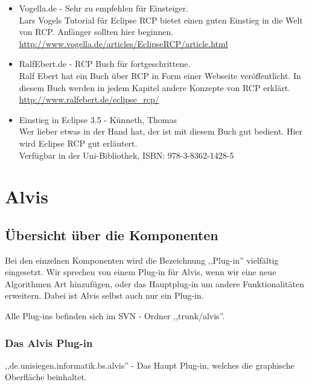 \documentclass[10pt,a4paper,oneside]{scrbook}
\begin{document}
\begin{itemize}
\item Vogella.de - Sehr zu empfehlen für Einsteiger. \\
Lars Vogels Tutorial für Eclipse RCP bietet einen guten Einstieg in die Welt von RCP. Anfänger sollten hier beginnen.\\
\url{http://www.vogella.de/articles/EclipseRCP/article.html}
\item RalfEbert.de - RCP Buch für fortgeschrittene. \\
Ralf Ebert hat ein Buch über RCP in Form einer Webseite veröffentlicht. In diesem Buch werden in jedem Kapitel andere Konzepte von RCP erklärt. \\
\url{http://www.ralfebert.de/eclipse\_rcp/}
\item Einstieg in Eclipse 3.5 - Künneth, Thomas \\
Wer lieber etwas in der Hand hat, der ist mit diesem Buch gut bedient. Hier wird Eclipse RCP gut erläutert. \\
Verfügbar in der Uni-Bibliothek, ISBN: 978-3-8362-1428-5
\end{itemize}


\newpage
\chapter{Alvis}
\section{Übersicht über die Komponenten}
Bei den einzelnen Komponenten wird die Bezeichnung ,,Plug-in'' vielfältig eingesetzt. Wir sprechen von einem Plug-in für Alvis, wenn wir eine neue Algorithmen Art hinzufügen, oder das Hauptplug-in um andere Funktionalitäten erweitern. Dabei ist Alvis selbst auch nur ein Plug-in.

Alle Plug-ins befinden sich im SVN - Ordner ,,trunk/alvis''.
\subsection{Das Alvis Plug-in}
,,de.unisiegen.informatik.bs.alvis'' - Das Haupt Plug-in, welches die graphische Oberfläche beinhaltet.
\end{document}
